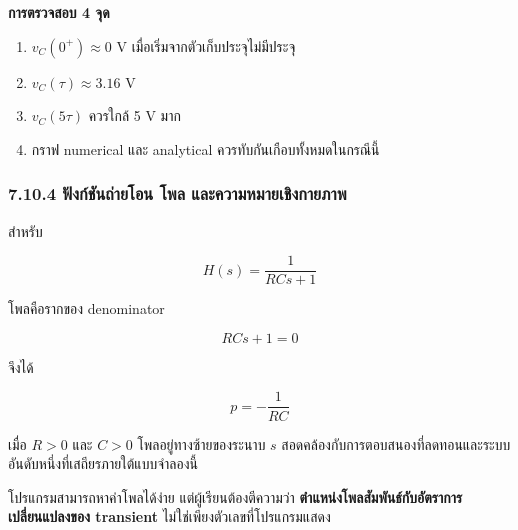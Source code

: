 \textbf{การตรวจสอบ 4 จุด}

\begin{enumerate}
    \item $v_C(0^+)\approx0$ V เมื่อเริ่มจากตัวเก็บประจุไม่มีประจุ
    \item $v_C(\tau)\approx3.16$ V
    \item $v_C(5\tau)$ ควรใกล้ 5 V มาก
    \item กราฟ numerical และ analytical ควรทับกันเกือบทั้งหมดในกรณีนี้
\end{enumerate}

\subsubsection{7.10.4 ฟังก์ชันถ่ายโอน โพล และความหมายเชิงกายภาพ}

สำหรับ

\[
H(s)=\frac{1}{RCs+1}
\]

โพลคือรากของ denominator

\[
RCs+1=0
\]

จึงได้

\[
p=-\frac{1}{RC}
\]

เมื่อ $R>0$ และ $C>0$ โพลอยู่ทางซ้ายของระนาบ $s$ สอดคล้องกับการตอบสนองที่ลดทอนและระบบอันดับหนึ่งที่เสถียรภายใต้แบบจำลองนี้

โปรแกรมสามารถหาค่าโพลได้ง่าย แต่ผู้เรียนต้องตีความว่า \textbf{ตำแหน่งโพลสัมพันธ์กับอัตราการเปลี่ยนแปลงของ transient} ไม่ใช่เพียงตัวเลขที่โปรแกรมแสดง


